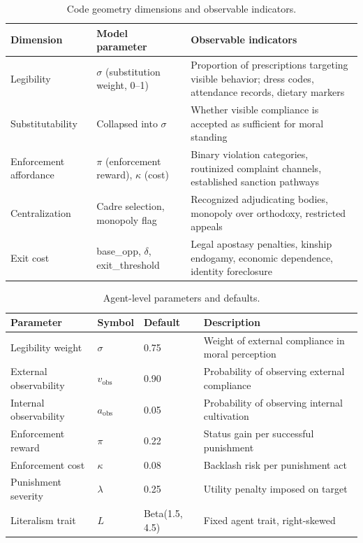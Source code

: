 \documentclass[12pt]{article}
\begin{document}
\begin{table}[ht]
\centering
\caption{Code geometry dimensions and observable indicators.}
\label{tab:dimensions}
\begin{tabular}{lp{5.5cm}p{5.5cm}}
\toprule
Dimension & Model parameter & Observable indicators \\
\midrule
Legibility & $\sigma$ (substitution weight, 0--1) & Proportion of prescriptions targeting visible behavior; dress codes, attendance records, dietary markers \\
Substitutability & Collapsed into $\sigma$ & Whether visible compliance is accepted as sufficient for moral standing \\
Enforcement affordance & $\pi$ (enforcement reward), $\kappa$ (cost) & Binary violation categories, routinized complaint channels, established sanction pathways \\
Centralization & Cadre selection, monopoly flag & Recognized adjudicating bodies, monopoly over orthodoxy, restricted appeals \\
Exit cost & base\_opp, $\delta$, exit\_threshold & Legal apostasy penalties, kinship endogamy, economic dependence, identity foreclosure \\
\bottomrule
\end{tabular}
\end{table}

\begin{table}[ht]
\centering
\caption{Agent-level parameters and defaults.}
\label{tab:agent-params}
\begin{tabular}{llll}
\toprule
Parameter & Symbol & Default & Description \\
\midrule
Legibility weight & $\sigma$ & 0.75 & Weight of external compliance in moral perception \\
External observability & $v_{\text{obs}}$ & 0.90 & Probability of observing external compliance \\
Internal observability & $a_{\text{obs}}$ & 0.05 & Probability of observing internal cultivation \\
Enforcement reward & $\pi$ & 0.22 & Status gain per successful punishment \\
Enforcement cost & $\kappa$ & 0.08 & Backlash risk per punishment act \\
Punishment severity & $\lambda$ & 0.25 & Utility penalty imposed on target \\
Literalism trait & $L$ & Beta(1.5, 4.5) & Fixed agent trait, right-skewed \\
\bottomrule
\end{tabular}
\end{table}
\end{document}
